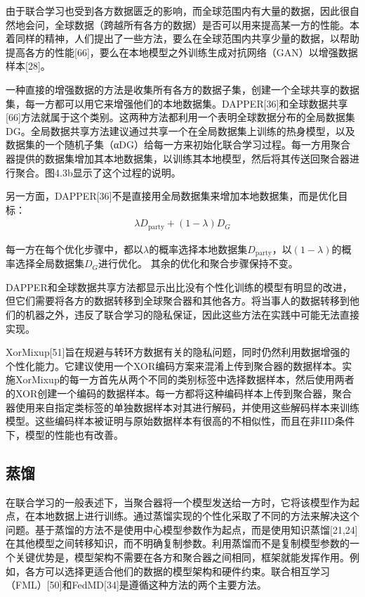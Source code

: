 由于联合学习也受到各方数据匮乏的影响，而全球范围内有大量的数据，因此很自然地会问，全球数据（跨越所有各方的数据）是否可以用来提高某一方的性能。本着同样的精神，人们提出了一些方法，要么在全球范围内共享少量的数据，以帮助提高各方的性能[66]，要么在本地模型之外训练生成对抗网络（GAN）以增强数据样本[28]。

一种直接的增强数据的方法是收集所有各方的数据子集，创建一个全球共享的数据集，每一方都可以用它来增强他们的本地数据集。DAPPER[36]和全球数据共享[66]方法就属于这个类别。这两种方法都利用一个表明全球数据分布的全局数据集DG。全局数据共享方法建议通过共享一个在全局数据集上训练的热身模型，以及数据集的一个随机子集（αDG）给每一方来初始化联合学习过程。每一方用聚合器提供的数据集增加其本地数据集，以训练其本地模型，然后将其传送回聚合器进行聚合。图4.3b显示了这个过程的说明。

另一方面，DAPPER[36]不是直接用全局数据集来增加本地数据集，而是优化目标：
\begin{align}\label{eq:4-8}
	\lambda D_{\text{party}} + (1 - \lambda)D_{G}
\end{align}

每一方在每个优化步骤中，都以$\lambda$的概率选择本地数据集$D_{\text{party}}$，以$(1 - \lambda)$的概率选择全局数据集$D_{G}$进行优化。 其余的优化和聚合步骤保持不变。

DAPPER和全球数据共享方法都显示出比没有个性化训练的模型有明显的改进，但它们需要将各方的数据转移到全球聚合器和其他各方。将当事人的数据转移到他们的机器之外，违反了联合学习的隐私保证，因此这些方法在实践中可能无法直接实现。

XorMixup[51]旨在规避与转环方数据有关的隐私问题，同时仍然利用数据增强的个性化能力。它建议使用一个XOR编码方案来混淆上传到聚合器的数据样本。实施XorMixup的每一方首先从两个不同的类别标签中选择数据样本，然后使用两者的XOR创建一个编码的数据样本。每一方都将这种编码样本上传到聚合器，聚合器使用来自指定类标签的单独数据样本对其进行解码，并使用这些解码样本来训练模型。这些编码样本被证明与原始数据样本有很高的不相似性，而且在非IID条件下，模型的性能也有改善。

\subsection{蒸馏}
在联合学习的一般表述下，当聚合器将一个模型发送给一方时，它将该模型作为起点，在本地数据上进行训练。通过蒸馏实现的个性化采取了不同的方法来解决这个问题。基于蒸馏的方法不是使用中心模型参数作为起点，而是使用知识蒸馏[21,24]在其他模型之间转移知识，而不明确复制参数。利用蒸馏而不是复制模型参数的一个关键优势是，模型架构不需要在各方和聚合器之间相同，框架就能发挥作用。例如，各方可以选择更适合他们的数据的模型架构和硬件约束。联合相互学习（FML）[50]和FedMD[34]是遵循这种方法的两个主要方法。

